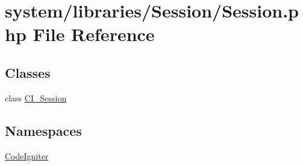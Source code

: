 \hypertarget{_session_8php}{}\section{system/libraries/\+Session/\+Session.php File Reference}
\label{_session_8php}
\subsection*{Classes}
\begin{DoxyCompactItemize}
\item 
class \mbox{\hyperlink{class_c_i___session}{C\+I\+\_\+\+Session}}
\end{DoxyCompactItemize}
\subsection*{Namespaces}
\begin{DoxyCompactItemize}
\item 
 \mbox{\hyperlink{namespace_code_igniter}{Code\+Igniter}}
\end{DoxyCompactItemize}
